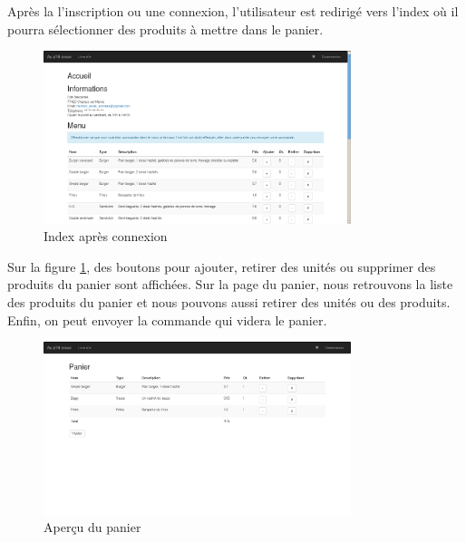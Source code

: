 Après la l'inscription ou une connexion, l'utilisateur est redirigé vers
l'index où il pourra sélectionner des produits à mettre dans le panier.

\begin{figure}[H]
	\centering
	\includegraphics[width=0.8\textwidth]{res/afterConnexion.png}
	\caption{Index après connexion}
	\label{fig:logged}
\end{figure}

Sur la figure \ref{fig:logged}, des boutons pour ajouter, retirer des unités ou
supprimer des produits du panier sont affichées. Sur la page du panier, nous
retrouvons la liste des produits du panier et nous pouvons aussi retirer des
unités ou des produits. Enfin, on peut envoyer la commande qui videra le panier.

\begin{figure}[H]
	\centering
	\includegraphics[width=0.8\textwidth]{res/panier.png}
	\caption{Aperçu du panier}
	\label{fig:cart}
\end{figure}
